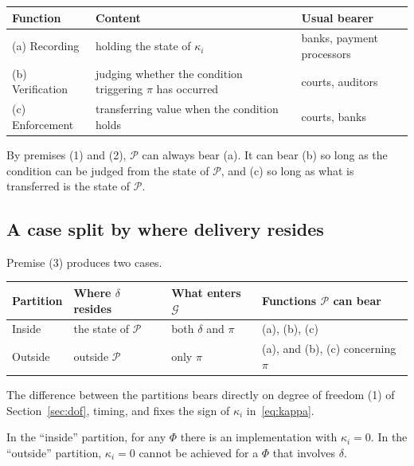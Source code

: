 \begin{center}
\begin{tabularx}{\textwidth}{@{}lXl@{}}
\toprule
Function & Content & Usual bearer \\
\midrule
(a) Recording & holding the state of $\kappa_i$ & banks, payment processors \\
(b) Verification & judging whether the condition triggering $\pi$ has occurred & courts, auditors \\
(c) Enforcement & transferring value when the condition holds & courts, banks \\
\bottomrule
\end{tabularx}
\label{tab:third-party-functions}
\end{center}

By premises (1) and (2), $\mathcal{P}$ can always bear (a). It can bear (b) so long as the
condition can be judged from the state of $\mathcal{P}$, and (c) so long as what is
transferred is the state of $\mathcal{P}$.

\subsection{A case split by where delivery resides}

Premise (3) produces two cases.

\begin{center}
\begin{tabularx}{\textwidth}{@{}llXX@{}}
\toprule
Partition & Where $\delta$ resides & What enters $\mathcal{G}$ & Functions $\mathcal{P}$ can bear \\
\midrule
Inside & the state of $\mathcal{P}$ & both $\delta$ and $\pi$ & (a), (b), (c) \\
Outside & outside $\mathcal{P}$ & only $\pi$ & (a), and (b), (c) concerning $\pi$ \\
\bottomrule
\end{tabularx}
\label{tab:protocol-cases}
\end{center}

The difference between the partitions bears directly on degree of freedom (1) of
Section~\ref{sec:dof}, timing, and fixes the sign of $\kappa_i$ in~\eqref{eq:kappa}.

\begin{proposition}[Simultaneity]
\label{prop:simultaneity}
In the ``inside'' partition, for any $\Phi$ there is an implementation with $\kappa_i=0$.
In the ``outside'' partition, $\kappa_i=0$ cannot be achieved for a $\Phi$ that involves
$\delta$.
\end{proposition}

